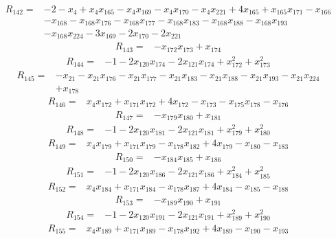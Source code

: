 \[\begin{aligned}R_{142}={}&-2-x_{4}+x_{4}x_{165}-x_{4}x_{169}-x_{4}x_{170}-x_{4}x_{221}+4x_{165}+x_{165}x_{171}-x_{166}
\\&-x_{168}-x_{168}x_{176}-x_{168}x_{177}-x_{168}x_{183}-x_{168}x_{188}-x_{168}x_{193}
\\&-x_{168}x_{224}-3x_{169}-2x_{170}-2x_{221}
\end{aligned}\]
\[\begin{aligned}R_{143}={}&-x_{172}x_{173}+x_{174}
\end{aligned}\]
\[\begin{aligned}R_{144}={}&-1-2x_{120}x_{174}-2x_{121}x_{174}+x_{172}^{2}+x_{173}^{2}
\end{aligned}\]
\[\begin{aligned}R_{145}={}&-x_{21}-x_{21}x_{176}-x_{21}x_{177}-x_{21}x_{183}-x_{21}x_{188}-x_{21}x_{193}-x_{21}x_{224}
\\&+x_{178}
\end{aligned}\]
\[\begin{aligned}R_{146}={}&x_{4}x_{172}+x_{171}x_{172}+4x_{172}-x_{173}-x_{175}x_{178}-x_{176}
\end{aligned}\]
\[\begin{aligned}R_{147}={}&-x_{179}x_{180}+x_{181}
\end{aligned}\]
\[\begin{aligned}R_{148}={}&-1-2x_{120}x_{181}-2x_{121}x_{181}+x_{179}^{2}+x_{180}^{2}
\end{aligned}\]
\[\begin{aligned}R_{149}={}&x_{4}x_{179}+x_{171}x_{179}-x_{178}x_{182}+4x_{179}-x_{180}-x_{183}
\end{aligned}\]
\[\begin{aligned}R_{150}={}&-x_{184}x_{185}+x_{186}
\end{aligned}\]
\[\begin{aligned}R_{151}={}&-1-2x_{120}x_{186}-2x_{121}x_{186}+x_{184}^{2}+x_{185}^{2}
\end{aligned}\]
\[\begin{aligned}R_{152}={}&x_{4}x_{184}+x_{171}x_{184}-x_{178}x_{187}+4x_{184}-x_{185}-x_{188}
\end{aligned}\]
\[\begin{aligned}R_{153}={}&-x_{189}x_{190}+x_{191}
\end{aligned}\]
\[\begin{aligned}R_{154}={}&-1-2x_{120}x_{191}-2x_{121}x_{191}+x_{189}^{2}+x_{190}^{2}
\end{aligned}\]
\[\begin{aligned}R_{155}={}&x_{4}x_{189}+x_{171}x_{189}-x_{178}x_{192}+4x_{189}-x_{190}-x_{193}
\end{aligned}\]

